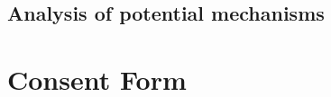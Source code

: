 \documentclass[11pt, a4paper]{article}\usepackage[]{graphicx}\usepackage[]{color}
\begin{document}
    \subsection{Analysis of potential mechanisms}

\newpage

\printbibliography

\newpage

\appendix

\section{Consent Form}

\end{document}
